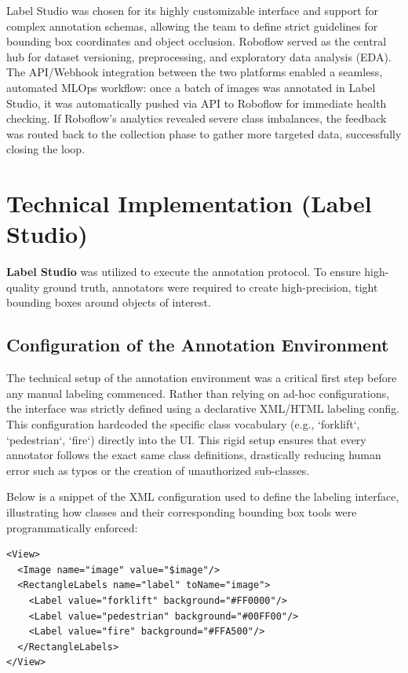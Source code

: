Label Studio was chosen for its highly customizable interface and support for complex annotation schemas, allowing the team to define strict guidelines for bounding box coordinates and object occlusion. Roboflow served as the central hub for dataset versioning, preprocessing, and exploratory data analysis (EDA). The API/Webhook integration between the two platforms enabled a seamless, automated MLOps workflow: once a batch of images was annotated in Label Studio, it was automatically pushed via API to Roboflow for immediate health checking. If Roboflow's analytics revealed severe class imbalances, the feedback was routed back to the collection phase to gather more targeted data, successfully closing the loop.

\section{Technical Implementation (Label Studio)}
\textbf{Label Studio} \cite{ref:labelstudio} was utilized to execute the annotation protocol. To ensure high-quality ground truth, annotators were required to create high-precision, tight bounding boxes around objects of interest.

\subsection{Configuration of the Annotation Environment}
The technical setup of the annotation environment was a critical first step before any manual labeling commenced. Rather than relying on ad-hoc configurations, the interface was strictly defined using a declarative XML/HTML labeling config. This configuration hardcoded the specific class vocabulary (e.g., `forklift`, `pedestrian`, `fire`) directly into the UI. This rigid setup ensures that every annotator follows the exact same class definitions, drastically reducing human error such as typos or the creation of unauthorized sub-classes.

Below is a snippet of the XML configuration used to define the labeling interface, illustrating how classes and their corresponding bounding box tools were programmatically enforced:

\begin{verbatim}
<View>
  <Image name="image" value="$image"/>
  <RectangleLabels name="label" toName="image">
    <Label value="forklift" background="#FF0000"/>
    <Label value="pedestrian" background="#00FF00"/>
    <Label value="fire" background="#FFA500"/>
  </RectangleLabels>
</View>
\end{verbatim}


